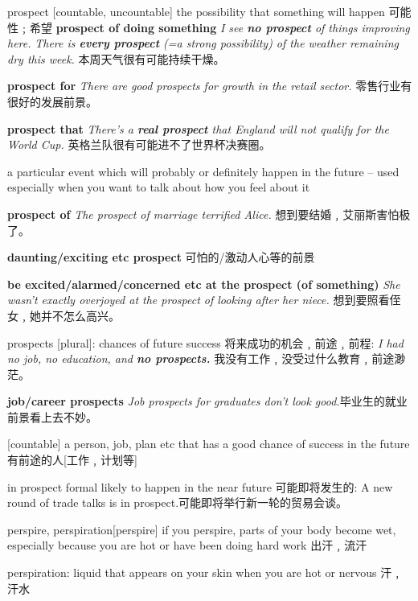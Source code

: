 \begin{DefWord}{prospect}
    [countable, uncountable] the possibility that something will happen 可能性﹔希望
    \textbf{prospect of doing something}
    \textit{I see \textbf{no prospect} of things improving here.}
    \textit{There is \textbf{every prospect} (=a strong possibility) of the weather remaining dry this week.} 本周天气很有可能持续干燥。
    
    \textbf{prospect for}
    \textit{There are good prospects for growth in the retail sector.} 零售行业有很好的发展前景。

    \textbf{prospect that}
    \textit{There’s a \textbf{real prospect} that England will not qualify for the World Cup.} 英格兰队很有可能进不了世界杯决赛圈。

    a particular event which will probably or definitely happen in the future – used especially when you want to talk about how you feel about it

    \textbf{prospect of}
    \textit{The prospect of marriage terrified Alice.} 想到要结婚﹐艾丽斯害怕极了。
    
\textbf{daunting/exciting etc prospect} 可怕的/激动人心等的前景

\textbf{be excited/alarmed/concerned etc at the prospect (of something)}
 \textit{She wasn’t exactly overjoyed at the prospect of looking after her niece.} 想到要照看侄女﹐她并不怎么高兴。

prospects [plural]: chances of future success 将来成功的机会﹐前途﹐前程:
 \textit{I had no job, no education, and \textbf{no prospects.}} 我没有工作﹐没受过什么教育﹐前途渺茫。

\textbf{job/career prospects}
 \textit{Job prospects for graduates don’t look good.}毕业生的就业前景看上去不妙。

[countable] a person, job, plan etc that has a good chance of success in the future 有前途的人[工作﹐计划等]

in prospect formal likely to happen in the near future 可能即将发生的:
 A new round of trade talks is in prospect.可能即将举行新一轮的贸易会谈。
\end{DefWord}

\begin{RefWord}{perspire, perspiration}[perspire]
    if you perspire, parts of your body become wet, especially because you are hot or have been doing hard work 出汗﹐流汗

    perspiration: liquid that appears on your skin when you are hot or nervous 汗﹐汗水
\end{RefWord}

